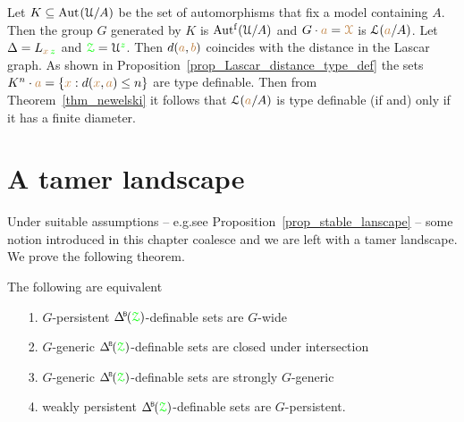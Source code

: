 

\begin{example}\label{ex_newelski}
  Let $K\subseteq{\rm Aut\kern.15ex}(\EuScript U/A)$ be the set of automorphisms that fix a model containing $A$.
  Then the group $G$  generated by $K$ is $\mbox{Aut$^{\rm f}$}(\EuScript U/A)$ and $G\cdot{\color{brown}a}={\color{brown}\EuScript X}$ is $\EuScript L({\color{brown} a}/A)$.
  Let $\Delta=L_{{\color{brown} x}\,{\color{green} z}}$ and ${\color{green}\EuScript Z}=\EuScript U^{\color{green} z}$.
  Then $d({\color{brown} a},{\color{brown} b})$ coincides with the distance in the Lascar graph.
  As shown in Proposition~\ref{prop_Lascar_distance_type_def} the sets $K^n\cdot{\color{brown}a}=\{{\color{brown} x}:d({\color{brown} x},{\color{brown} a})\le n\}$ are type definable.
  Then from Theorem~\ref{thm_newelski} it follows that $\EuScript L({\color{brown} a}/A)$ is type definable (if and) only if it has a finite diameter.
\end{example} 

\section{A tamer landscape}\label{tame_landscape}

Under suitable assumptions -- e.g.\@ see Proposition~\ref{prop_stable_lanscape} -- some  notion introduced in this chapter coalesce and we are left with a tamer landscape.
We prove the following theorem.

\begin{theorem}\label{thm_coalesce}
  The following are equivalent
  \begin{itemize}
    \item[1.] $G$-persistent $\BDelta({\grZ})$-definable sets are $G$-wide
    \item[2.] $G$-generic $\BDelta({\grZ})$-definable sets are closed under intersection 
    \item[3.] $G$-generic $\BDelta({\grZ})$-definable sets are strongly $G$-generic
    \item[4.] weakly persistent $\BDelta({\grZ})$-definable sets are $G$-persistent.
  \end{itemize}
\end{theorem}

